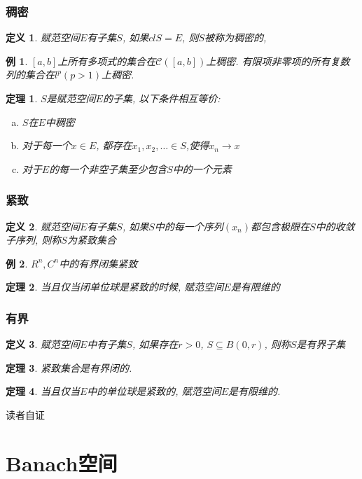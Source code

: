 \documentclass{book}
\newtheorem{definition}{\hspace{2em}定义}[section]
\newtheorem{theorem}{\hspace{2em}定理}[section]
\newtheorem{example}{例}[section]
\begin{document}
\subsubsection*{稠密}
\begin{definition}
  赋范空间$E$有子集$S$, 如果$cl S=E$, 则$S$被称为稠密的,
\end{definition}
\begin{example}
  $[a,b]$上所有多项式的集合在$\mathcal{C}([a,b])$上稠密. 有限项非零项的所有复数列的集合在$l^p(p>1)$上稠密.
\end{example}
\begin{theorem}
  $S$是赋范空间$E$的子集, 以下条件相互等价:
  \begin{enumerate}[(a)]
    \item $S$在$E$中稠密
    \item 对于每一个$x\in E$, 都存在$x_1,x_2,\dots\in S$,使得$x_n\to x$
    \item 对于$E$的每一个非空子集至少包含$S$中的一个元素
  \end{enumerate}
\end{theorem}
\subsubsection*{紧致}
\begin{definition}
  赋范空间$E$有子集$S$, 如果$S$中的每一个序列$(x_n)$都包含极限在$S$中的收敛子序列, 则称$S$为紧致集合
\end{definition}
\begin{example}
  $R^n,C^n$中的有界闭集紧致
\end{example}
\begin{theorem}
  当且仅当闭单位球是紧致的时候, 赋范空间$E$是有限维的
\end{theorem}
\subsubsection*{有界}
\begin{definition}
  赋范空间$E$中有子集$S$, 如果存在$r>0$, $S\subseteq B(0,r)$, 则称$S$是有界子集
\end{definition}
\begin{theorem}
  紧致集合是有界闭的.
\end{theorem}
\begin{theorem}
  当且仅当$E$中的单位球是紧致的, 赋范空间$E$是有限维的.
\end{theorem}
读者自证
\section{Banach空间}
\end{document}

